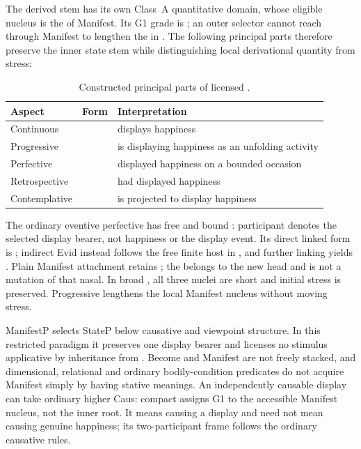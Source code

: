 The derived stem has its own Class~A quantitative domain, whose eligible
nucleus is the  of Manifest. Its G1 grade is ; an outer
selector cannot reach through Manifest to lengthen the  in
. The following principal parts therefore preserve the inner
state stem while distinguishing local derivational quantity from stress:

\begin{table}[htbp]
\footnotesize
\caption{Constructed principal parts of licensed .}
\label{tab:stative-manifest}
\begin{tabularx}{\textwidth}{l l L}
\toprule
Aspect & Form & Interpretation \\
\midrule
Continuous &  & displays happiness \\
Progressive &  & is displaying happiness as an unfolding activity \\
Perfective &  & displayed happiness on a bounded occasion \\
Retrospective &  & had displayed happiness \\
Contemplative &  & is projected to display happiness \\
\bottomrule
\end{tabularx}
\end{table}

The ordinary eventive perfective has free  and bound
: participant  denotes the selected display
bearer, not happiness or the display event. Its direct linked form is
; indirect Evid instead follows the free finite host in
, and further linking yields .
Plain Manifest attachment retains ; the  belongs to the
new head and is not a mutation of that nasal. In broad
, all three nuclei are
short and initial stress is preserved. Progressive
lengthens the local Manifest nucleus without moving stress.

ManifestP selects StateP below causative and viewpoint structure. In this
restricted paradigm it preserves one display bearer and licenses no stimulus
applicative by inheritance from . Become and Manifest are not
freely stacked, and dimensional, relational and ordinary bodily-condition
predicates do not acquire Manifest simply by having stative meanings.
An independently causable display can take ordinary higher Caus: compact
 assigns G1 to the accessible Manifest nucleus, not
the inner root. It means causing a display and need not mean causing genuine
happiness; its two-participant frame follows the ordinary causative rules.

